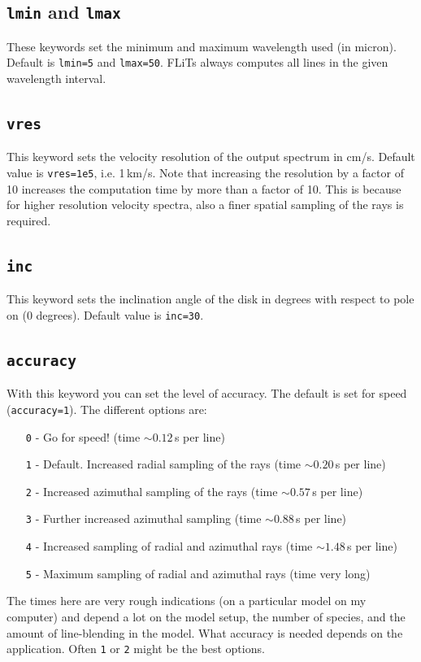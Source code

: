 \documentclass[12pt]{article}
\begin{document}
\subsection*{\texttt{lmin} and \texttt{lmax}}

These keywords set the minimum and maximum wavelength used (in micron). Default is \texttt{lmin=5} and \texttt{lmax=50}. FLiTs always computes all lines in the given wavelength interval.

\subsection*{\texttt{vres}}

This keyword sets the velocity resolution of the output spectrum in cm/s. Default value is \texttt{vres=1e5}, i.e. 1\,km/s. Note that increasing the resolution by a factor of 10 increases the computation time by more than a factor of 10. This is because for higher resolution velocity spectra, also a finer spatial sampling of the rays is required.

\subsection*{\texttt{inc}}

This keyword sets the inclination angle of the disk in degrees with respect to pole on (0 degrees). Default value is \texttt{inc=30}.

\subsection*{\texttt{accuracy}}

With this keyword you can set the level of accuracy. The default is set for speed (\texttt{accuracy=1}). The different options are:
\begin{itemize}
\item[\texttt{0} -] Go for speed! (time $\sim 0.12\,$s per line)
\item[\texttt{1} -] Default. Increased radial sampling of the rays (time $\sim 0.20\,$s per line)
\item[\texttt{2} -] Increased azimuthal sampling of the rays (time $\sim 0.57\,$s per line)
\item[\texttt{3} -] Further increased azimuthal sampling (time $\sim 0.88\,$s per line)
\item[\texttt{4} -] Increased sampling of radial and azimuthal rays (time $\sim 1.48\,$s per line)
\item[\texttt{5} -] Maximum sampling of radial and azimuthal rays (time very long)
\end{itemize}
The times here are very rough indications (on a particular model on my computer) and depend a lot on the model setup, the number of species, and the amount of line-blending in the model. What accuracy is needed depends on the application. Often \texttt{1} or \texttt{2} might be the best options.
\end{document}
